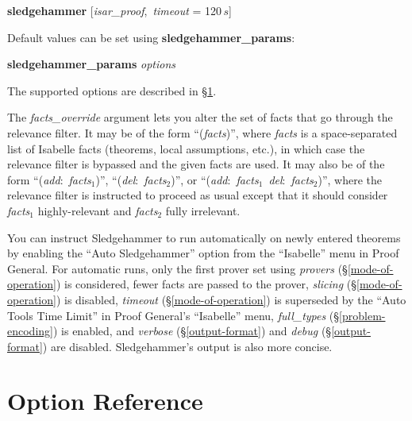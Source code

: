 \documentclass[a4paper,12pt]{article}
\begin{document}
\prew
\textbf{sledgehammer} [\textit{isar\_proof}, \,\textit{timeout} = 120$\,s$]
\postw

Default values can be set using \textbf{sledgehammer\_\allowbreak params}:

\prew
\textbf{sledgehammer\_params} \textit{options}
\postw

The supported options are described in \S\ref{option-reference}.

The \textit{facts\_override} argument lets you alter the set of facts that go
through the relevance filter. It may be of the form ``(\textit{facts})'', where
\textit{facts} is a space-separated list of Isabelle facts (theorems, local
assumptions, etc.), in which case the relevance filter is bypassed and the given
facts are used. It may also be of the form ``(\textit{add}:\ \textit{facts}$_1$)'',
``(\textit{del}:\ \textit{facts}$_2$)'', or ``(\textit{add}:\ \textit{facts}$_1$\
\textit{del}:\ \textit{facts}$_2$)'', where the relevance filter is instructed to
proceed as usual except that it should consider \textit{facts}$_1$
highly-relevant and \textit{facts}$_2$ fully irrelevant.

You can instruct Sledgehammer to run automatically on newly entered theorems by
enabling the ``Auto Sledgehammer'' option from the ``Isabelle'' menu in Proof
General. For automatic runs, only the first prover set using \textit{provers}
(\S\ref{mode-of-operation}) is considered, fewer facts are passed to the prover,
\textit{slicing} (\S\ref{mode-of-operation}) is disabled, \textit{timeout}
(\S\ref{mode-of-operation}) is superseded by the ``Auto Tools Time Limit'' in
Proof General's ``Isabelle'' menu, \textit{full\_types}
(\S\ref{problem-encoding}) is enabled, and \textit{verbose}
(\S\ref{output-format}) and \textit{debug} (\S\ref{output-format}) are disabled.
Sledgehammer's output is also more concise.

\section{Option Reference}
\label{option-reference}
\end{document}
